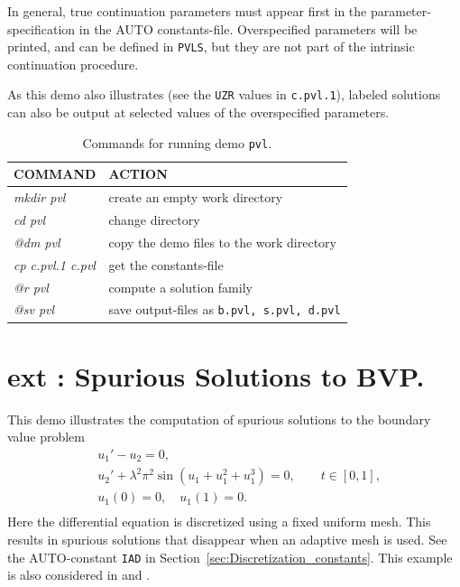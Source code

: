\documentclass[12pt]{report}
\begin{document}
In general, true continuation parameters must appear first in the
parameter-specification in the {\cal AUTO} constants-file.
Overspecified parameters will be printed, and can be
defined in {\tt PVLS}, but they are not part of the intrinsic continuation
procedure.

As this demo also illustrates (see the {\tt UZR} values in {\tt c.pvl.1}),
labeled solutions can also be output at selected values 
of the overspecified parameters.

\begin{table}[htbp]
\begin{center}
\begin{tabular}{| l | l |}
\hline
  COMMAND  & ACTION \\
\hline
  {\it mkdir pvl} & create an empty work directory \\ 
  {\it cd pvl} & change directory \\
  {\it @dm pvl} & copy the demo files to the work directory \\
\hline
  {\it cp c.pvl.1 c.pvl} & get the constants-file \\ 
  {\it @r pvl} & compute a solution family \\ 
  {\it @sv pvl} & save output-files as {\tt b.pvl, s.pvl, d.pvl} \\ 
\hline
\end{tabular}
\caption{Commands for running demo {\tt pvl}.}
\label{tbl:demo_pvl}
\end{center}
\end{table}

\newpage
\section{ ext : Spurious Solutions to BVP.} \label{sec:Demos_ext}

This demo illustrates the computation of spurious solutions
to the boundary value problem
\begin{equation} \begin{array}{cl}
& u_1' - u_2 = 0 , \\
& u_2' + \lambda^2 \pi^2 \sin( u_1 + u_1^2 + u_1^3 ) = 0,
  \qquad t \in [0,1], \\ 
& u_1(0) = 0, \quad u_1(1) = 0. \\
\end{array} \end{equation}
Here the differential equation is discretized using a fixed uniform mesh.
This results in spurious solutions that disappear when an adaptive mesh is used.
See the {\cal AUTO}-constant {\tt IAD} in Section~\ref{sec:Discretization_constants}.
This example is also considered in
 \citeyear{BeDo:81}
and
 \citeyear{DoKeKe:91b}.
\end{document}
